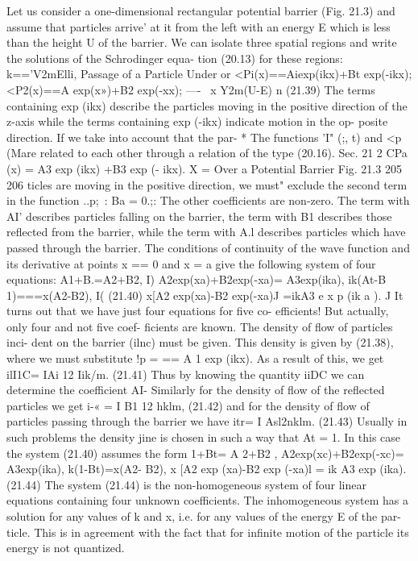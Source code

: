 \documentclass[a4paper,sfsidenotes,colorlinks=true]{tufte-book}
\numberwithin{equation}{section}
\numberwithin{figure}{section}
\begin{document}
{{{{Let us consider a one-dimensional rectangular potential barrier (Fig. 21.3) and assume that particles arrive' at it from the left with an energy E which is less than the height U of the barrier. We can isolate three spatial regions and write the solutions of the Schrodinger equa- tion (20.13) for these regions:
k=='V2mElli,
Passage of a Particle Under or
<Pi(x)==Aiexp(ikx)+Bt exp(-ikx); <P2(x)==A exp(x»)+B2 exp(-xx);
----~
x
Y2m(U-E)
n
(21.39)
The terms containing exp (ikx) describe the particles moving in the positive direction of the z-axis while the terms containing exp (-ikx) indicate motion in the op- posite direction. If we take into account that the par-
* The functions 'I" (;, t) and <p (Mare related to each other through a relation of the type (20.16).
Sec. 21
2 CPa (x) = A3 exp (ikx) +B3 exp (-	ikx).
X =
Over a Potential Barrier
Fig. 21.3
205
206
ticles are moving in the positive direction, we must" exclude the second term in the function ..p;~: Ba = 0.;: The other coefficients are non-zero. The term with AI' describes particles falling on the barrier, the term with B1 describes those reflected from the barrier, while the term with A.l describes particles which have passed through the barrier.
The conditions of continuity of the wave function and its derivative at points x == 0 and x = a give the following system of four equations:
A1+B.=A2+B2, I) A2exp(xa)+B2exp(-xa)= A3exp(ika),
ik(At-B 1)===x(A2-B2),	I(	(21.40) x[A2 exp(xa)-B2 exp(-xa)J
=ikA3 e x p (ik a ).	J
It turns out that we have just four equations for five co- efficients! But actually, only four and not five coef- ficients are known. The density of flow of particles inci- dent on the barrier (ilnc) must be given. This density is given by (21.38), where we must substitute !p =
== A 1 exp (ikx). As a result of this, we get ilI1C= IAi 12 Iik/m.	(21.41)
Thus by knowing the quantity iiDC we can determine the coefficient AI- Similarly for the density of flow of the reflected particles we get
i-« = I B1 12 hklm,	(21.42) and for the density of flow of particles passing through
the barrier we have
itr= I Asl2nklm.	(21.43)
Usually in such problems the density jine is chosen in such a way that At = 1. In this case the system (21.40) assumes the form
1+Bt= A 2+B2 , A2exp(xc)+B2exp(-xc)= A3exp(ika),
k(1-Bt)=x(A2- B2), x [A2 exp (xa)-B2 exp (-xa)l = ik A3 exp (ika).
(21.44)
The system (21.44) is the non-homogeneous system of four linear equations containing four unknown coefficients.
The inhomogeneous system has a solution for any values of k and x, i.e. for any values of the energy E of the par- ticle. This is in agreement with the fact that for infinite motion of the particle its energy is not quantized.
}}}}
\end{document}
